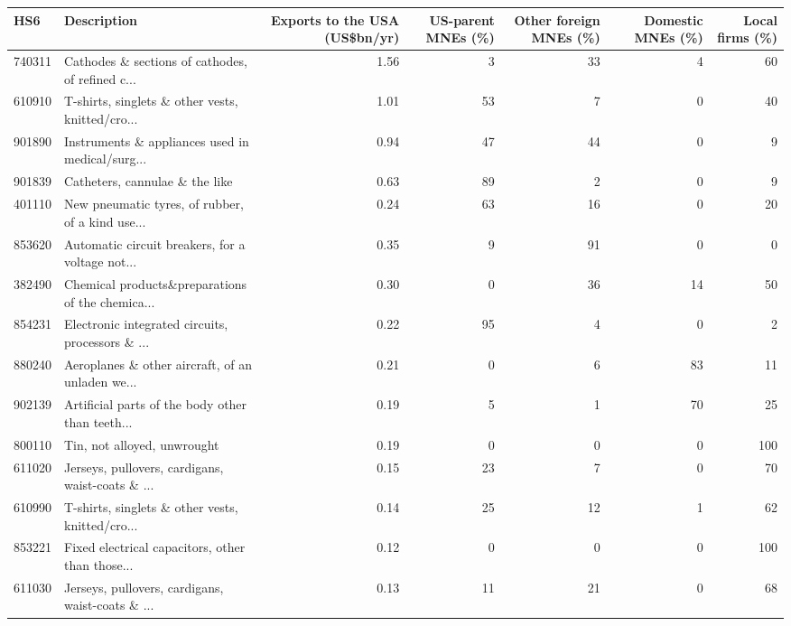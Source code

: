 \begin{tabular}{llrrrrr}
\toprule
HS6 & Description & \multicolumn{1}{p{2.0cm}}{\raggedright Exports to the USA (US\$bn/yr)} & \multicolumn{1}{p{1.8cm}}{\raggedright US-parent MNEs (\%)} & \multicolumn{1}{p{1.8cm}}{\raggedright Other foreign MNEs (\%)} & \multicolumn{1}{p{1.8cm}}{\raggedright Domestic MNEs (\%)} & \multicolumn{1}{p{1.8cm}}{\raggedright Local firms (\%)} \\
\midrule
740311 & Cathodes \& sections of cathodes, of refined c... & 1.56 & 3 & 33 & 4 & 60 \\
610910 & T-shirts, singlets \& other vests, knitted/cro... & 1.01 & 53 & 7 & 0 & 40 \\
901890 & Instruments \& appliances used in medical/surg... & 0.94 & 47 & 44 & 0 & 9 \\
901839 & Catheters, cannulae \& the like & 0.63 & 89 & 2 & 0 & 9 \\
401110 & New pneumatic tyres, of rubber, of a kind use... & 0.24 & 63 & 16 & 0 & 20 \\
853620 & Automatic circuit breakers, for a voltage not... & 0.35 & 9 & 91 & 0 & 0 \\
382490 & Chemical products\&preparations of the chemica... & 0.30 & 0 & 36 & 14 & 50 \\
854231 & Electronic integrated circuits, processors \& ... & 0.22 & 95 & 4 & 0 & 2 \\
880240 & Aeroplanes \& other aircraft, of an unladen we... & 0.21 & 0 & 6 & 83 & 11 \\
902139 & Artificial parts of the body other than teeth... & 0.19 & 5 & 1 & 70 & 25 \\
800110 & Tin, not alloyed, unwrought & 0.19 & 0 & 0 & 0 & 100 \\
611020 & Jerseys, pullovers, cardigans, waist-coats \& ... & 0.15 & 23 & 7 & 0 & 70 \\
610990 & T-shirts, singlets \& other vests, knitted/cro... & 0.14 & 25 & 12 & 1 & 62 \\
853221 & Fixed electrical capacitors, other than those... & 0.12 & 0 & 0 & 0 & 100 \\
611030 & Jerseys, pullovers, cardigans, waist-coats \& ... & 0.13 & 11 & 21 & 0 & 68 \\
\bottomrule
\end{tabular}
